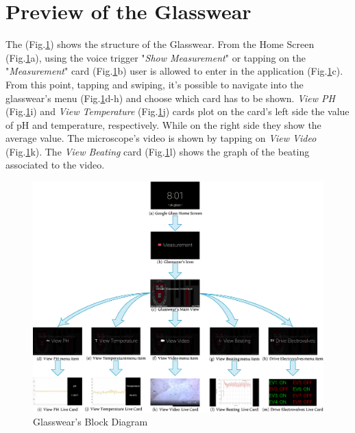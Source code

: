 \documentclass[12pt,a4paper,twoside]{article}
\begin{document}
	\section*{Preview of the Glasswear}
	The (Fig.\ref{Fig:GlasswearDiagram}) shows the structure of the Glasswear. From the Home Screen (Fig.\ref{Fig:GlasswearDiagram}a), using the voice trigger "\textit{Show Measurement}" or tapping on the "\textit{Measurement}" card (Fig.\ref{Fig:GlasswearDiagram}b) user is allowed to enter in the application (Fig.\ref{Fig:GlasswearDiagram}c). From this point, tapping and swiping, it's possible to navigate into the glasswear's menu (Fig.\ref{Fig:GlasswearDiagram}d-h) and choose which card has to be shown. \textit{View PH} (Fig.\ref{Fig:GlasswearDiagram}i) and \textit{View Temperature} (Fig.\ref{Fig:GlasswearDiagram}j) cards  plot on the card's left side the value of pH and temperature, respectively. While on the right side they show the average value. The microscope's video is shown by tapping on \textit{View Video} (Fig.\ref{Fig:GlasswearDiagram}k). The \textit{View Beating} card (Fig.\ref{Fig:GlasswearDiagram}l) shows the graph of the beating associated to the video.
	\\
	
	\begin{figure}[h]
		\centering
		\includegraphics[width=\textwidth]{Intro/block-app.eps}
		\caption{Glasswear's Block Diagram}
		\label{Fig:GlasswearDiagram}
	\end{figure}
	
\end{document}
